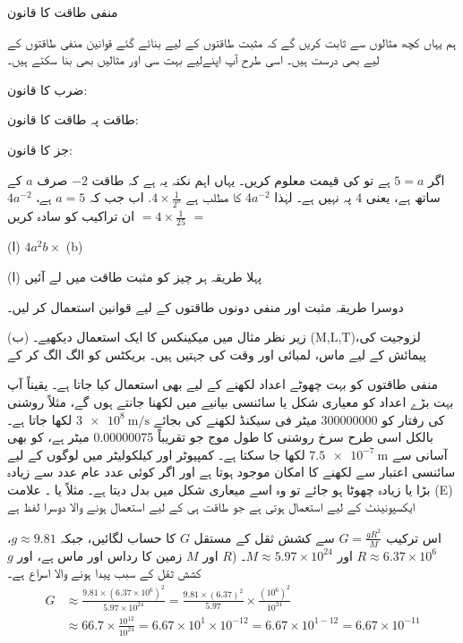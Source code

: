 منفی طاقت کا قانون

 ہم یہاں کچھ مثالوں سے ثابت کریں گے کہ مثبت طاقتوں کے لیے بنائے گئے قوانین منفی طاقتوں کے لیے بھی درست ہیں۔ اسی طرح آپ اپنےلیے بہت سی اور مثالیں بھی بنا سکتے ہیں۔

ضرب کا قانون:

طاقت پہ طاقت کا قانون:

جز کا قانون:

اگر  $ 5= a$ ہے تو  کی قیمت معلوم کریں۔
یہاں اہم نکتہ یہ ہے کہ طاقت 
$-2$
صرف
$a$
کے ساتھ ہے، یعنی $4$ پہ نہیں ہے۔ لہٰذا  
$4a^{-2}$
کا مطلب ہے
\(4\times{\frac{1}{2^{a}}}\). اب جب کہ \(a=5\) ہے،  \(4a^{-2}\) \(=\) \(=4\times{\frac{1}{25}}\)
ان تراکیب کو سادہ کریں

(ا) 
\(4a^{2}b\times\)
(b)

(ا) پہلا طریقہ ہر چیز کو مثبت طاقت میں لے آئیں

دوسرا طریقہ
مثبت اور منفی دونوں طاقتوں کے لیے قوانین استعمال کر لیں۔


(ب) زیر نظر مثال میں میکینکس کا ایک استعمال دیکھیے۔ (M,L,T)،لزوجیت کی پیمائش کے لیے ماس، لمبائی اور وقت کی جہتیں ہیں۔ بریکٹس کو الگ الگ کر کے


منفی طاقتوں کو بہت چھوٹے اعداد لکھنے کے لیے بھی استعمال کیا جاتا ہے۔ یقیناً آپ بہت بڑے اعداد کو معیاری شکل یا سائنسی بیانیے میں لکھنا جانتے ہوں گے، مثلاً روشنی کی رفتار کو  \num{300000000} میٹر فی سیکنڈ لکھنے کی بجائے
\(\SI{3e8}{\meter\per\second}\)
 لکھا جاتا ہے۔ بالکل اسی طرح سرخ روشنی کا طول موج جو تقریباً 
\num{0.00000075} میٹر ہے، کو بھی آسانی سے 
\(\SI{7.5e-7}{\meter}\)  لکھا جا سکتا ہے۔
کمپیوٹر اور کیلکولیٹر میں لوگوں کے لیے سائنسی اعتبار سے لکھنے کا امکان موجود ہوتا ہے اور اگر کوئی عدد عام عدد سے زیادہ بڑا یا زیادہ چھوٹا ہو جائے تو وہ اسے میعاری شکل میں بدل دیتا ہے۔ مثلاً  یا ۔ علامت
(E) ایکسپونینٹ کے لیے استعمال ہوتی ہے جو طاقت ہی کے لیے استعمال ہونے والا دوسرا لفظ ہے

اس ترکیب \(G=\frac{gR^{2}}{M}\) سے کشش ثقل کے مستقل \(G\) کا حساب لگائیں، جبکہ \(g\approx 9.81\)،
\(R\approx 6.37\times 10^{6}\) اور
\(M\approx 5.97\times 10^{24}\)۔ 
(\(R\) اور \(M\) زمین کا رداس اور ماس ہے، اور 
\( g \) کشش ثقل کے سبب پیدا ہونے والا اسراع ہے۔
\begin{align*}
G&\approx \frac{9.81\times (6.37\times 10^{6})^{2}}{5.97\times 10^{24}}=\frac{9.81\times(6.37)^{2}}{5.97}\times \frac{(10^{6})^{2}}{10^{24}}\\
&\approx 66.7\times\frac{10^{12}}{10^{24}}=6.67\times 10^{1}\times 10^{-12}=6.67\times 10^{1-12}=6.67\times 10^{-11}\\
\end{align*}

